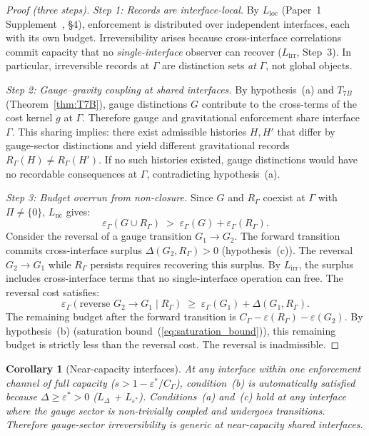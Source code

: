 \documentclass[11pt,a4paper]{article}
\newtheorem{corollary}[theorem]{Corollary}
\theoremstyle{definition}
\begin{document}
\begin{proof}[Proof (three steps)]

\textit{Step 1: Records are interface-local.}\quad
By $L_{\mathrm{loc}}$ (Paper~1 Supplement~\cite{BrookeSupplement}, \S4), enforcement
is distributed over independent interfaces, each with its own budget.
Irreversibility arises because cross-interface correlations commit
capacity that no \emph{single-interface} observer can recover
($L_{\mathrm{irr}}$, Step~3).  In particular, irreversible records at
$\Gamma$ are distinction sets \emph{at} $\Gamma$, not global objects.

\textit{Step 2: Gauge--gravity coupling at shared interfaces.}\quad
By hypothesis~(a) and $T_{7B}$ (Theorem~\ref{thm:T7B}), gauge
distinctions $G$ contribute to the cross-terms of the cost kernel $g$
at $\Gamma$.  Therefore gauge and gravitational enforcement share
interface $\Gamma$.  This sharing implies: there exist admissible
histories $H, H'$ that differ by gauge-sector distinctions and yield
different gravitational records $R_\Gamma(H) \ne R_\Gamma(H')$.  If
no such histories existed, gauge distinctions would have no recordable
consequences at $\Gamma$, contradicting hypothesis~(a).

\textit{Step 3: Budget overrun from non-closure.}\quad
Since $G$ and $R_\Gamma$ coexist at $\Gamma$ with $\Pi \ne \{0\}$,
$L_{\mathrm{nc}}$ gives:
\[
  \varepsilon_\Gamma(G \cup R_\Gamma)
  \;>\;
  \varepsilon_\Gamma(G) + \varepsilon_\Gamma(R_\Gamma).
\]
Consider the reversal of a gauge transition $G_1 \to G_2$.  The
forward transition commits cross-interface surplus
$\Delta(G_2, R_\Gamma) > 0$ (hypothesis~(c)).  The reversal
$G_2 \to G_1$ while $R_\Gamma$ persists requires recovering this
surplus.  By $L_{\mathrm{irr}}$, the surplus includes cross-interface
terms that no single-interface operation can free.  The reversal cost
satisfies:
\[
  \varepsilon_\Gamma(\text{reverse } G_2 \to G_1 \mid R_\Gamma)
  \;\ge\;
  \varepsilon_\Gamma(G_1) + \Delta(G_1, R_\Gamma).
\]
The remaining budget after the forward transition is
$C_\Gamma - \varepsilon(R_\Gamma) - \varepsilon(G_2)$.  By
hypothesis~(b) (saturation bound~(\ref{eq:saturation_bound})),
this remaining budget is strictly less than the reversal cost.
The reversal is inadmissible.
\end{proof}

\begin{corollary}[Near-capacity interfaces]
At any interface within one enforcement channel of full capacity
($s > 1 - \varepsilon^*/C_\Gamma$), condition~(b) is automatically
satisfied because $\Delta \ge \varepsilon^* > 0$ ($L_\Delta$ +
$L_{\varepsilon^*}$).  Conditions~(a) and~(c) hold at any interface
where the gauge sector is non-trivially coupled and undergoes
transitions.  Therefore gauge-sector irreversibility is generic at
near-capacity shared interfaces.
\end{corollary}
\end{document}
